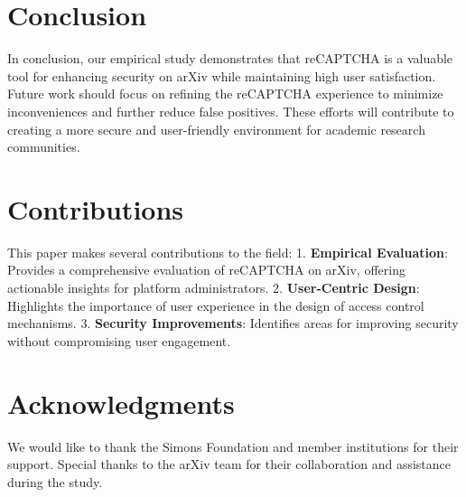 \documentclass{article}
\begin{document}
\section{Conclusion}
In conclusion, our empirical study demonstrates that reCAPTCHA is a valuable tool for enhancing security on arXiv while maintaining high user satisfaction. Future work should focus on refining the reCAPTCHA experience to minimize inconveniences and further reduce false positives. These efforts will contribute to creating a more secure and user-friendly environment for academic research communities.

\section{Contributions}
This paper makes several contributions to the field:
1. \textbf{Empirical Evaluation}: Provides a comprehensive evaluation of reCAPTCHA on arXiv, offering actionable insights for platform administrators.
2. \textbf{User-Centric Design}: Highlights the importance of user experience in the design of access control mechanisms.
3. \textbf{Security Improvements}: Identifies areas for improving security without compromising user engagement.

\section{Acknowledgments}
We would like to thank the Simons Foundation and member institutions for their support. Special thanks to the arXiv team for their collaboration and assistance during the study.



\end{document}
